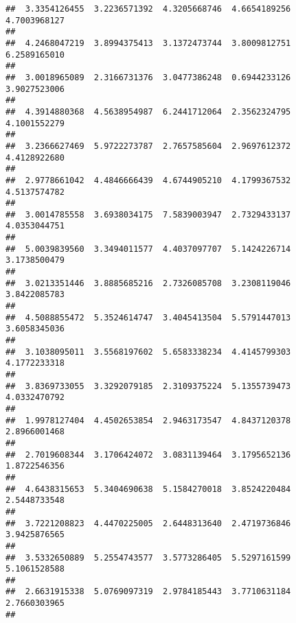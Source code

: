 \documentclass[]{article}
\begin{document}
\begin{verbatim}
##  3.3354126455  3.2236571392  4.3205668746  4.6654189256  4.7003968127 
##                                                                       
##  4.2468047219  3.8994375413  3.1372473744  3.8009812751  6.2589165010 
##                                                                       
##  3.0018965089  2.3166731376  3.0477386248  0.6944233126  3.9027523006 
##                                                                       
##  4.3914880368  4.5638954987  6.2441712064  2.3562324795  4.1001552279 
##                                                                       
##  3.2366627469  5.9722273787  2.7657585604  2.9697612372  4.4128922680 
##                                                                       
##  2.9778661042  4.4846666439  4.6744905210  4.1799367532  4.5137574782 
##                                                                       
##  3.0014785558  3.6938034175  7.5839003947  2.7329433137  4.0353044751 
##                                                                       
##  5.0039839560  3.3494011577  4.4037097707  5.1424226714  3.1738500479 
##                                                                       
##  3.0213351446  3.8885685216  2.7326085708  3.2308119046  3.8422085783 
##                                                                       
##  4.5088855472  5.3524614747  3.4045413504  5.5791447013  3.6058345036 
##                                                                       
##  3.1038095011  3.5568197602  5.6583338234  4.4145799303  4.1772233318 
##                                                                       
##  3.8369733055  3.3292079185  2.3109375224  5.1355739473  4.0332470792 
##                                                                       
##  1.9978127404  4.4502653854  2.9463173547  4.8437120378  2.8966001468 
##                                                                       
##  2.7019608344  3.1706424072  3.0831139464  3.1795652136  1.8722546356 
##                                                                       
##  4.6438315653  5.3404690638  5.1584270018  3.8524220484  2.5448733548 
##                                                                       
##  3.7221208823  4.4470225005  2.6448313640  2.4719736846  3.9425876565 
##                                                                       
##  3.5332650889  5.2554743577  3.5773286405  5.5297161599  5.1061528588 
##                                                                       
##  2.6631915338  5.0769097319  2.9784185443  3.7710631184  2.7660303965 
##                                                                       

\end{verbatim}
\end{document}
